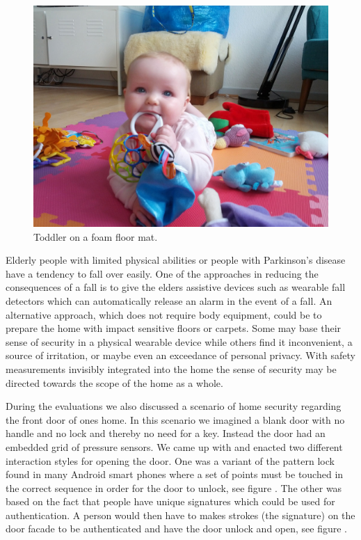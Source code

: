 \begin{figure}[h]
  \centering
  \begin{minipage}[b]{.8\textwidth}
    \centering
    \includegraphics[width=.7\linewidth]{figures/touch/evaluation/softtiles}
  \caption[Toddler on a foam floor mat with puzzle-like tiles for extensibility.]
  {Toddler on a foam floor mat.}
  \label{fig:textiletouch:eval:softtiles}
  \end{minipage}
\end{figure}

Elderly people with limited physical abilities or people with Parkinson's disease have a tendency to fall over easily.
One of the approaches in reducing the consequences of a fall is to give the elders assistive devices such as wearable fall detectors which can automatically release an alarm in the event of a fall.
An alternative approach, which does not require body equipment, could be to prepare the home with impact sensitive floors or carpets.
Some may base their sense of security in a physical wearable device while others find it inconvenient, a source of irritation, or maybe even an exceedance of personal privacy. 
With safety measurements invisibly integrated into the home the sense of security may be directed towards the scope of the home as a whole.

During the evaluations we also discussed a scenario of home security regarding the front door of ones home.
In this scenario we imagined a blank door with no handle and no lock and thereby no need for a key.
Instead the door had an embedded grid of pressure sensors.
We came up with and enacted two different interaction styles for opening the door.
One was a variant of the pattern lock found in many Android smart phones where a set of points must be touched in the correct sequence in order for the door to unlock, see figure .
The other was based on the fact that people have unique signatures which could be used for authentication.
A person would then have to makes strokes (the signature) on the door facade to be authenticated and have the door unlock and open, see figure .

